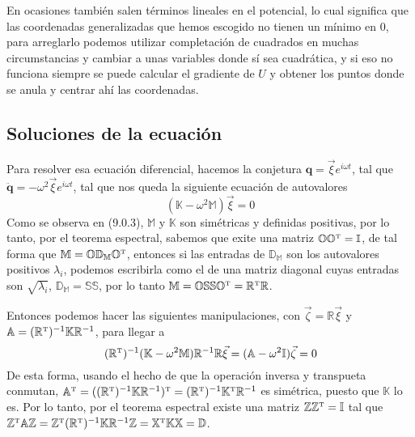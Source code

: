 En ocasiones también salen términos lineales en el potencial, lo cual significa que las coordenadas generalizadas que hemos escogido no tienen un mínimo en 0, para arreglarlo podemos utilizar completación de cuadrados en muchas circumstancias y cambiar a unas variables donde sí sea cuadrática, y si eso no funciona siempre se puede calcular el gradiente de $U$ y obtener los puntos donde se anula y centrar ahí las coordenadas.
\vspace{-15pt}
\subsection{Soluciones de la ecuación}
Para resolver esa ecuación diferencial, hacemos la conjetura $\mathbf{q} = \vec{\xi} e^{i\omega t}$, tal que $\ddot{\mathbf{q}} = -\omega^2 \vec{\xi} e^{i\omega t}$, tal que nos queda la siguiente ecuación de autovalores
\begin{equation} \label{6.1.1}
    (\mathbb{K}-\omega^2 \mathbb{M})\vec{\xi} = 0
\end{equation}
Como se observa en (9.0.3), $\mathbb{M}$ y $\mathbb{K}$ son simétricas y definidas positivas, por lo tanto, por el teorema espectral, sabemos que exite una matriz $\mathbb{O} \mathbb{O}^{\mbox{\tiny T}} = \mathbb{I}$, de tal forma que $\mathbb{M} = \mathbb{O} \mathbb{D}_\mathbb{M} \mathbb{O}^{\mbox{\tiny T}}$, entonces si las entradas de $\mathbb{D}_\mathbb{M}$ son los autovalores positivos $\lambda_i$, podemos escribirla como el de una matriz diagonal cuyas entradas son $\sqrt{\lambda_i}$, $\mathbb{D}_\mathbb{M} = \mathbb{S} \mathbb{S}$, por lo tanto $\mathbb{M} = \mathbb{O} \mathbb{S} \mathbb{S} \mathbb{O}^{\mbox{\tiny T}} = \mathbb{R}^{\mbox{\tiny T}} \mathbb{R}$.

Entonces podemos hacer las siguientes manipulaciones, con $\vec{\zeta} = \mathbb{R}\vec{\xi}$ y $\mathbb{A} = (\mathbb{R}^{\mbox{\tiny T}})^{-1}\mathbb{K}\mathbb{R}^{-1}$, para llegar a 
\begin{equation} \label{6.1.1}
    (\mathbb{R}^{\mbox{\tiny T}})^{-1}(\mathbb{K}-\omega^2 \mathbb{M})\mathbb{R}^{-1} \mathbb{R}\vec{\xi} = (\mathbb{A}-\omega^2 \mathbb{I}) \vec{\zeta}= 0
\end{equation}
De esta forma, usando el hecho de que la operación inversa y transpueta conmutan, $\mathbb{A}^{\mbox{\tiny T}} = ((\mathbb{R}^{\mbox{\tiny T}})^{-1}\mathbb{K}\mathbb{R}^{-1})^{\mbox{\tiny T}}= (\mathbb{R}^{\mbox{\tiny T}})^{-1}\mathbb{K}^{\mbox{\tiny T}} \mathbb{R}^{-1}$ es simétrica, puesto que $\mathbb{K}$ lo es. Por lo tanto, por el teorema espectral existe una matriz $\mathbb{Z}\mathbb{Z}^{\mbox{\tiny T}} = \mathbb{I}$ tal que $\mathbb{Z}^{\mbox{\tiny T}} \mathbb{A} \mathbb{Z} = \mathbb{Z}^{\mbox{\tiny T}} (\mathbb{R}^{\mbox{\tiny T}})^{-1}\mathbb{K}\mathbb{R}^{-1} \mathbb{Z}=\mathbb{X}^{\mbox{\tiny T}} \mathbb{K} \mathbb{X} = \mathbb{D}$.

